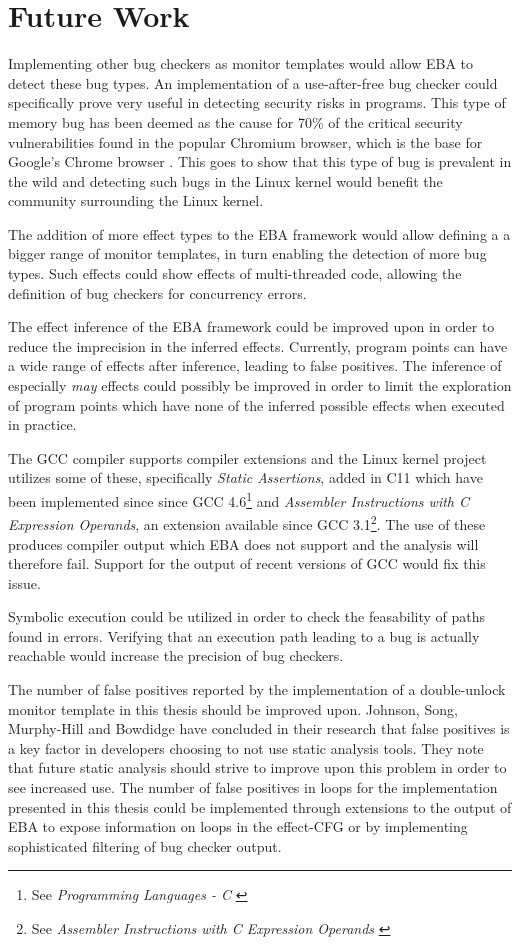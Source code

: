 \section{Future Work}

Implementing other bug checkers as monitor templates would allow EBA to detect these bug types. An implementation of a use-after-free bug checker could specifically prove very useful in detecting security risks in programs. This type of memory bug has been deemed as the cause for 70\% of the critical security vulnerabilities found in the popular Chromium browser, which is the base for Google's Chrome browser \cite{google-use-after-free}. This goes to show that this type of bug is prevalent in the wild and detecting such bugs in the Linux kernel would benefit the community surrounding the Linux kernel.

\newpar The addition of more effect types to the EBA framework would allow defining a a bigger range of monitor templates, in turn enabling the detection of more bug types. Such effects could show effects of multi-threaded code, allowing the definition of bug checkers for concurrency errors. 

\newpar The effect inference of the EBA framework could be improved upon in order to reduce the imprecision in the inferred effects. Currently, program points can have a wide range of effects after inference, leading to false positives. The inference of especially \textit{may} effects could possibly be improved in order to limit the exploration of program points which have none of the inferred possible effects when executed in practice. 

\newpar The GCC compiler supports compiler extensions and the Linux kernel project utilizes some of these, specifically \textit{Static Assertions}, added in C11 which have been implemented since since GCC 4.6\footnote{See \textit{Programming Languages - C} \cite{ISO:2011:IIIb}} and \textit{Assembler Instructions with C Expression Operands}, an extension available since GCC 3.1\footnote{See \textit{Assembler Instructions with C Expression Operands} \cite{GCC:3.1}}. The use of these produces compiler output which EBA does not support and the analysis will therefore fail. Support for the output of recent versions of GCC would fix this issue. 

\newpar Symbolic execution could be utilized in order to check the feasability of paths found in errors. Verifying that an execution path leading to a bug is actually reachable would increase the precision of bug checkers.  

\newpar The number of false positives reported by the implementation of a double-unlock monitor template in this thesis should be improved upon. Johnson, Song, Murphy-Hill and Bowdidge \cite{false-positives} have concluded in their research that false positives is a key factor in developers choosing to not use static analysis tools. They note that future static analysis should strive to improve upon this problem in order to see increased use. The number of false positives in loops for the implementation presented in this thesis could be implemented through extensions to the output of EBA to expose information on loops in the effect-CFG or by implementing sophisticated filtering of bug checker output.